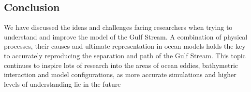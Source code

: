 \documentclass[..\EOYR.tex]{subfiles}
\begin{document}
\subsection{Conclusion}

We have discussed the ideas and challenges facing researchers when trying to understand and improve the model of the Gulf Stream. A combination of physical processes, their causes and ultimate representation in ocean models holds the key to accurately reproducing the separation and path of the Gulf Stream. This topic continues to inspire lots of research into the areas of ocean eddies, bathymetric interaction and model configurations, as more accurate simulations and higher levels of understanding lie in the future
\end{document}
